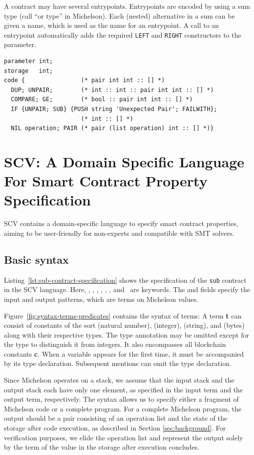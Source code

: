\documentclass[runningheads]{llncs}
\begin{document}
A contract may have several entrypoints. Entrypoints are encoded by
using a sum type (call ``or type'' in Michelson). Each (nested) alternative in a sum can be
given a name, which is used as the name for an entrypoint. A call to
an entrypoint automatically adds the required \lstinline|LEFT| and
\lstinline|RIGHT| constructors to the parameter.
\lstset{language=michelson}
\begin{lstlisting}[float,captionpos=b,caption={A Michelson program},label={lst:simple-program-add}]
parameter int;
storage   int;
code {                (* pair int int :: [] *)
  DUP; UNPAIR;        (* int :: int :: pair int int :: [] *) 
  COMPARE; GE;        (* bool :: pair int int :: [] *)
  IF {UNPAIR; SUB} {PUSH string 'Unexpected Pair'; FAILWITH};
                      (* int :: [] *)
  NIL operation; PAIR (* pair (list operation) int :: [] *)}
\end{lstlisting}
\section{SCV: A Domain Specific Language For Smart Contract Property Specification}
\label{sec:domain-specific-language}
SCV contains a domain-specific language to specify smart contract properties, aiming to be user-friendly for non-experts and compatible with SMT solvers. 
\subsection{Basic syntax}
\label{sec:basic-syntax}
Listing~\ref{lst:sub-contract-specification} shows the specification of the \texttt{sub} contract in the SCV language. Here, \KMCONTRACT, \KSPEC, \KCODE, \KINPUT, \KOUTPUT, \KPRECONDI, and \KPOSTCONDI\ are keywords. The \KINPUT{} and \KOUTPUT{} fields specify the input and output patterns, which are terms on Michelson values.

Figure~\ref{fig:syntax-terms-predicates} contains the syntax of terms: A term \textbf{t} can consist of constants of the sort  (natural number),  (integer),  (string), and  (bytes) along with their respective types. The type annotation may be omitted except for the type  to distinguish it from integers. It also encompasses all blockchain constants \textbf{c}. When a variable appears for the first time, it must be accompanied by its type declaration. Subsequent mentions can omit the type declaration.

Since Michelson operates on a stack, we assume that the input stack and the output stack each have only one element, as specified in the input term and the output term, respectively. The syntax allows us to specify either a fragment of Michelson code or a complete program. For a complete Michelson program, the output should be a pair consisting of an operation list and the state of the storage after code execution,  as described in Section \ref{sec:background}. For verification purposes, we elide the operation list and represent the output solely by the term of the value in the storage after execution concludes. 
\end{document}

